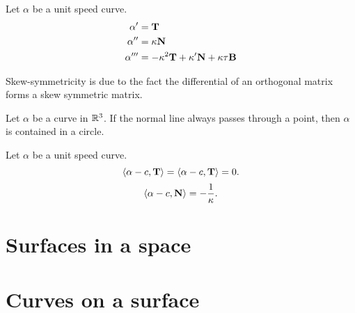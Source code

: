 \documentclass{../exp}
\begin{document}
\begin{thm}
Let $\alpha$ be a unit speed curve.
\begin{align*}
\alpha'&=\mathbf{T}\\
\alpha''&=\kappa\mathbf{N}\\
\alpha'''&=-\kappa^2\mathbf{T}+\kappa'\mathbf{N}+\kappa\tau\mathbf{B}
\end{align*}
\end{thm}

Skew-symmetricity is due to the fact the differential of an orthogonal matrix forms a skew symmetric matrix.

\begin{ex}
Let $\alpha$ be a curve in $\mathbb{R}^3$.
If the normal line always passes through a point, then $\alpha$ is contained in a circle.
\end{ex}
\begin{pf}
Let $\alpha$ be a unit speed curve.
\[\left\langle\alpha-c,\mathbf{T}\right\rangle=\left\langle\alpha-c,\mathbf{T}\right\rangle=0.\]
\[\left\langle\alpha-c,\mathbf{N}\right\rangle=-\frac1\kappa.\]

\end{pf}



\section{Surfaces in a space}



\section{Curves on a surface}
\end{document}
